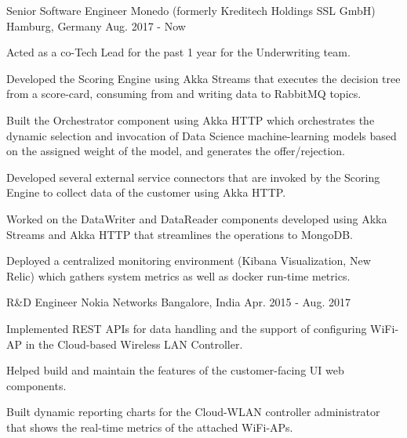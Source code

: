 

\begin{cventries}

  \cventry
    {Senior Software Engineer} %
    {Monedo (formerly Kreditech Holdings SSL GmbH)} %
    {Hamburg, Germany} %
    {Aug. 2017 - Now} %
    {
      \begin{cvitems} %
        \item {Acted as a co-Tech Lead for the past 1 year for the Underwriting team.}
        \item {Developed the Scoring Engine using Akka Streams that executes the decision tree from a score-card, consuming from and writing data to RabbitMQ topics.}
        \item {Built the Orchestrator component using Akka HTTP which orchestrates the dynamic selection and invocation of Data Science machine-learning models based on the assigned weight of the model, and generates the offer/rejection.}
        \item {Developed several external service connectors that are invoked by the Scoring Engine to collect data of the customer using Akka HTTP.}
        \item {Worked on the DataWriter and DataReader components developed using Akka Streams and Akka HTTP that streamlines the operations to MongoDB.}
        \item {Deployed a centralized monitoring environment (Kibana Visualization, New Relic) which gathers system metrics as well as docker run-time metrics.}
      \end{cvitems}
    }

  \cventry
    {R\&D Engineer} %
    {Nokia Networks} %
    {Bangalore, India} %
    {Apr. 2015 - Aug. 2017} %
    {
      \begin{cvitems} %
        \item {Implemented REST APIs for data handling and the support of configuring WiFi-AP in the Cloud-based Wireless LAN Controller.}
        \item {Helped build and maintain the features of the customer-facing UI web components.}
        \item {Built dynamic reporting charts for the Cloud-WLAN controller administrator that shows the real-time metrics of the attached WiFi-APs.}
      \end{cvitems}
    }


\end{cventries}
